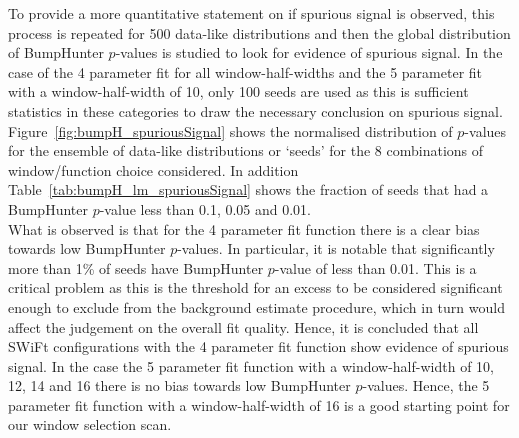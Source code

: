 To provide a more quantitative statement on if spurious signal is observed,
this process is repeated for 500 data-like distributions and then the global distribution of {\sc BumpHunter} $p$-values is studied to look for evidence of spurious signal.
In the case of the 4 parameter fit for all window-half-widths and the 5 parameter fit with a window-half-width of 10,
only 100 seeds are used as this is sufficient statistics in these categories to draw the necessary conclusion on spurious signal.
Figure~\ref{fig:bumpH_spuriousSignal} shows the normalised distribution of $p$-values for the ensemble of data-like distributions or `seeds'
for the 8 combinations of window/function choice considered.
In addition Table~\ref{tab:bumpH_lm_spuriousSignal} shows the fraction of seeds that had a {\sc BumpHunter} $p$-value less than 0.1, 0.05 and 0.01. \\

What is observed is that for the 4 parameter fit function  there is a clear bias towards
low {\sc BumpHunter} $p$-values. In particular, it is notable that significantly more than 1\% of seeds have {\sc BumpHunter} $p$-value of less than 0.01.
This is a critical problem as this is the threshold for an excess
to be considered significant enough to exclude from the background estimate procedure,
which in turn would affect the judgement on the overall fit quality.
Hence, it is concluded that all SWiFt configurations with the 4 parameter fit function show evidence of spurious signal.
In the case the 5 parameter fit function
with a window-half-width of 10, 12, 14 and 16 there is no bias towards low {\sc BumpHunter} $p$-values.
Hence, the 5 parameter fit function with a window-half-width of 16 is a good starting point for our window selection scan.\\

